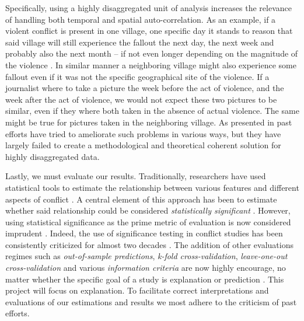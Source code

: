 \documentclass[a4paper]{article}
\begin{document}
Specifically, using a highly disaggregated unit of analysis increases the relevance of handling both temporal and spatial auto-correlation. As an example, if a violent conflict is present in one village, one specific day it stands to reason that said village will still experience the fallout the next day, the next week and probably also the next month -- if not even longer depending on the magnitude of the violence \cite[15-17]{SPECIALE}. In similar manner a neighboring village might also experience some fallout even if it was not the specific geographical site of the violence. If a journalist where to take a picture the week before the act of violence, and the week after the act of violence, we would not expect these two pictures to be similar, even if they where both taken in the absence of actual violence. The same might be true for pictures taken in the neighboring village. As presented in \cite{SPECIALE} past efforts have tried to ameliorate such problems in various ways, but they have largely failed to create a methodological and theoretical coherent solution for highly disaggregated data.\par 

Lastly, we must evaluate our results. Traditionally, researchers have used statistical tools to estimate the relationship between various features and different aspects of conflict \citep[8]{chadefaux2017conflict}. A central element of this approach has been to estimate whether said relationship could be considered \emph{statistically significant} \citep[363-364]{Ward_Greenhill_Bakke_2010}. However, using statistical significance as the prime metric of evaluation is now considered imprudent \citep{Ward_Greenhill_Bakke_2010, Schrodt_2014, chadefaux2017conflict}. Indeed, the use of significance testing in conflict studies has been consistently criticized for almost two decades \citep{king_zeng_2001b, Ward_Greenhill_Bakke_2010, Goldstone_2010, Schrodt_2014, chadefaux2017conflict}. The addition of other evaluations regimes such as \emph{out-of-sample predictions}, \emph{k-fold cross-validation}, \emph{leave-one-out cross-validation} and various \emph{information criteria} are now highly encourage, no matter whether the specific goal of a study is explanation or prediction \citep{Ward_Greenhill_Bakke_2010, Schrodt_2014, Mcelreath_2018}. This project will focus on explanation. To facilitate correct interpretations and evaluations of our estimations and results we most adhere to the criticism of past efforts.\par 
\end{document}
